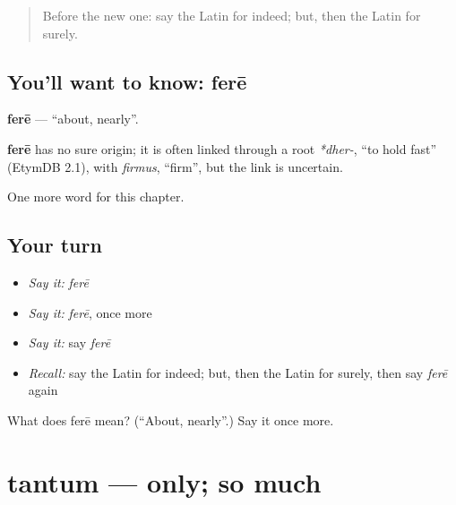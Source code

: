 \label{lesson:LA-C210-fere}



\begin{quote}
Before the new one: say the Latin for indeed; but, then the Latin for surely.
\end{quote}

\subsection*{You'll want to know: ferē}
\textbf{ferē} — \textquotedblleft{}about, nearly\textquotedblright{}.

\begin{cousinweb}
\textbf{ferē} has no sure origin; it is often linked through a root \emph{*dher-}, \textquotedblleft{}to hold fast\textquotedblright{} (EtymDB 2.1), with \emph{firmus}, \textquotedblleft{}firm\textquotedblright{}, but the link is uncertain.
\end{cousinweb}

\begin{grammarlens}[title={What you've built}]
One more word for this chapter.
\end{grammarlens}

\subsection*{Your turn}
\begin{itemize}
\raggedright
  \item \emph{Say it:} \emph{ferē}
  \item \emph{Say it:} \emph{ferē}, once more
  \item \emph{Say it:} say \emph{ferē}
  \item \emph{Recall:} say the Latin for indeed; but, then the Latin for surely, then say \emph{ferē} again
\end{itemize}

\begin{tcolorbox}[breakable,colback=teal!4,colframe=teal!35!black,title={Before you move on}]
What does ferē mean? (\textquotedblleft{}About, nearly\textquotedblright{}.) Say it once more.
\end{tcolorbox}
\section[tantum]{tantum — only; so much}

\label{lesson:LA-C210-tantum}



